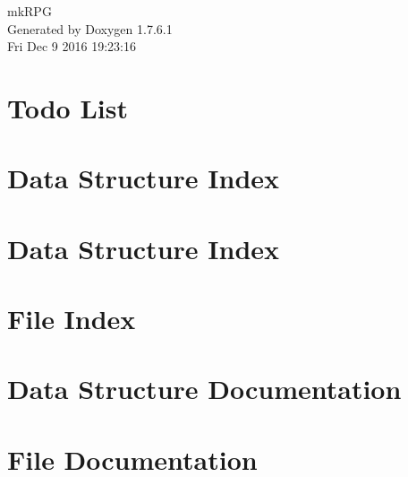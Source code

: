 \documentclass[a4paper]{book}
\begin{document}
\hypersetup{pageanchor=false,citecolor=blue}
\begin{titlepage}
\vspace*{7cm}
\begin{center}
{\Large mk\-R\-P\-G }\\
\vspace*{1cm}
{\large \-Generated by Doxygen 1.7.6.1}\\
\vspace*{0.5cm}
{\small Fri Dec 9 2016 19:23:16}\\
\end{center}
\end{titlepage}
\clearemptydoublepage
{}
\tableofcontents
\clearemptydoublepage
{}
\hypersetup{pageanchor=true,citecolor=blue}
\chapter{\-Todo \-List}
\label{todo}
\hypertarget{todo}{}

\chapter{\-Data \-Structure \-Index}

\chapter{\-Data \-Structure \-Index}

\chapter{\-File \-Index}

\chapter{\-Data \-Structure \-Documentation}













































\chapter{\-File \-Documentation}










\printindex
\end{document}
